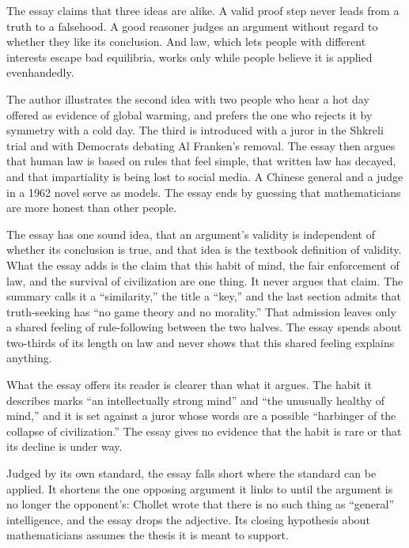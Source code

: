 \begin{afterword}
\summaryhead

The essay claims that three ideas are alike. A valid proof step never leads from a truth to a falsehood. A good reasoner judges an argument without regard to whether they like its conclusion. And law, which lets people with different interests escape bad equilibria, works only while people believe it is applied evenhandedly.

The author illustrates the second idea with two people who hear a hot day offered as evidence of global warming, and prefers the one who rejects it by symmetry with a cold day. The third is introduced with a juror in the Shkreli trial and with Democrats debating Al Franken's removal. The essay then argues that human law is based on rules that feel simple, that written law has decayed, and that impartiality is being lost to social media. A Chinese general and a judge in a 1962 novel serve as models. The essay ends by guessing that mathematicians are more honest than other people.

\responsehead

The essay has one sound idea, that an argument's validity is independent of whether its conclusion is true, and that idea is the textbook definition of validity. What the essay adds is the claim that this habit of mind, the fair enforcement of law, and the survival of civilization are one thing. It never argues that claim. The summary calls it a ``similarity,'' the title a ``key,'' and the last section admits that truth-seeking has ``no game theory and no morality.'' That admission leaves only a shared feeling of rule-following between the two halves. The essay spends about two-thirds of its length on law and never shows that this shared feeling explains anything.

What the essay offers its reader is clearer than what it argues. The habit it describes marks ``an intellectually strong mind'' and ``the unusually healthy of mind,'' and it is set against a juror whose words are a possible ``harbinger of the collapse of civilization.'' The essay gives no evidence that the habit is rare or that its decline is under way.

Judged by its own standard, the essay falls short where the standard can be applied. It shortens the one opposing argument it links to until the argument is no longer the opponent's: Chollet wrote that there is no such thing as ``general'' intelligence, and the essay drops the adjective. Its closing hypothesis about mathematicians assumes the thesis it is meant to support.


\end{afterword}
